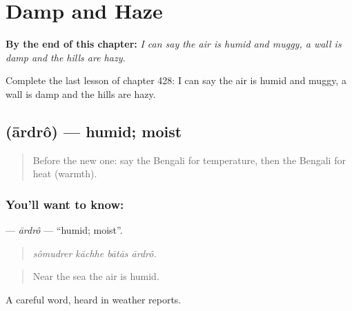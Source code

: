 
\chapter{Damp and Haze}
\label{ch:bn-damp-and-haze}

\begin{chapteropening}
\textbf{By the end of this chapter:} \emph{I can say the air is humid and muggy, a wall is damp and the hills are hazy.}

Complete the last lesson of chapter 428: I can say the air is humid and muggy, a wall is damp and the hills are hazy.
\end{chapteropening}

\section[\texorpdfstring{\bn{আর্দ্র} (ārdrô)}{আর্দ্র (ārdrô)}]{ (ārdrô) — humid; moist}

\label{lesson:BN-C428-ardro}



\begin{quote}
Before the new one: say the Bengali for temperature, then the Bengali for heat (warmth).
\end{quote}

\subsection*{You'll want to know: }
\textbf{} — \emph{ārdrô} — \textquotedblleft{}humid; moist\textquotedblright{}.

\begin{quote}
   
\end{quote}

\begin{quote}
\emph{sômudrer kāchhe bātās ārdrô.}
\end{quote}

\begin{quote}
Near the sea the air is humid.
\end{quote}

A careful word, heard in weather reports.

